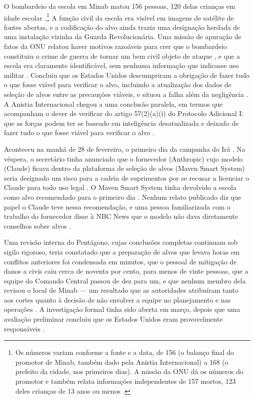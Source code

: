 O bombardeio da escola em Minab matou 156 pessoas, 120 delas crianças em idade escolar \autocite[par.~92]{UNFFMIran2026}.\footnote{Os números variam conforme a fonte e a data, de 156 (o balanço final do promotor de Minab, também dado pela Anistia Internacional) a 168 (o prefeito da cidade, nos primeiros dias). A missão da ONU dá os números do promotor e também relata informações independentes de 157 mortos, 123 deles crianças de 13 anos ou menos \autocite[pars.~92–93]{UNFFMIran2026}.} A função civil da escola era visível em imagens de satélite de fontes abertas, e a codificação do alvo ainda trazia uma designação herdada de uma instalação vizinha da Guarda Revolucionária. Uma missão de apuração de fatos da ONU relatou haver motivos razoáveis para crer que o bombardeio constituiu o crime de guerra de tornar um bem civil objeto de ataque \autocite{ohchr2026minabpress}, e que a escola era claramente identificável, sem nenhuma informação que indicasse uso militar \autocite[pars.~81–86, 124–126]{UNFFMIran2026}. Concluiu que os Estados Unidos descumpriram a obrigação de fazer tudo o que fosse viável para verificar o alvo, incluindo a atualização dos dados de seleção de alvos entre as precauções viáveis, e situou a falha além da negligência \autocite[pars.~124–125]{UNFFMIran2026}. A Anistia Internacional chegou a uma conclusão paralela, em termos que acompanham o dever de verificar do artigo 57(2)(a)(i) do Protocolo Adicional I: que as forças podem ter se baseado em inteligência desatualizada e deixado de fazer tudo o que fosse viável para verificar o alvo \autocite{Amnesty2026Minab}.

Aconteceu na manhã de 28 de fevereiro, o primeiro dia da campanha do Irã \autocite{Amnesty2026Minab,crs2026iranwar}. Na véspera, o secretário tinha anunciado que o fornecedor (Anthropic) cujo modelo (Claude) ficava dentro da plataforma de seleção de alvos (Maven Smart System) seria designado um risco para a cadeia de suprimentos por se recusar a licenciar o Claude para todo uso legal \autocite{npr2026openai}. O Maven Smart System tinha devolvido a escola como alvo recomendado para o primeiro dia \autocite{livingstone2026maven,gizmodo2026minab}. Nenhum relato publicado diz que papel o Claude teve nessa recomendação, e uma pessoa familiarizada com o trabalho do fornecedor disse à NBC News que o modelo não dava diretamente conselhos sobre alvos \autocite{nbc2026targeting}.

Uma revisão interna do Pentágono, cujas conclusões completas continuam sob sigilo rigoroso, teria constatado que a preparação de alvos que levava horas em conflitos anteriores foi condensada em minutos, que o pessoal de mitigação de danos a civis caiu cerca de noventa por cento, para menos de vinte pessoas, que a equipe do Comando Central passou de dez para um, e que nenhum membro dela revisou o local de Minab — um resultado que as autoridades atribuíram tanto aos cortes quanto à decisão de não envolver a equipe no planejamento e nas operações \autocite{Bloomberg2026KillChain}. A investigação formal tinha sido aberta em março, depois que uma avaliação preliminar concluiu que os Estados Unidos eram provavelmente responsáveis \autocite{NPR2026MinabProbe}.

